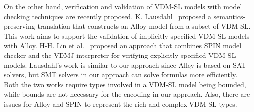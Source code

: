 On the other hand, verification and validation of VDM-SL models with model checking techniques are recently proposed. K. Lausdahl~\cite{kenneth:ifm2013} proposed a semantics-preserving translation that constructs an Alloy model from a subset of VDM-SL. This work aims to support the validation of implicitly specified VDM-SL models with Alloy. H-H. Lin et al.~\cite{DBLP:conf/ftscs/LinOKA15} proposed an approach that combines SPIN model checker and the VDMJ interpreter for verifying explicitly specified VDM-SL models. Lausdahl's work is similar to our approach since Alloy is based on SAT solvers, but SMT solvers in our approach can solve formulas more efficiently. Both the two works require types involved in a VDM-SL model being bounded, while bounds are not necessary for the encoding in our approach. Also, there are issues for Alloy and SPIN to represent the rich and complex VDM-SL types.


